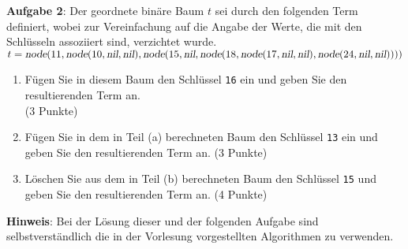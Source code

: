 \documentclass{article}
\begin{document}
\noindent
\textbf{Aufgabe 2}:
Der geordnete bin\"are Baum $t$ sei durch den folgenden Term definiert,
wobei zur Vereinfachung auf die Angabe der Werte, die mit den Schl\"usseln
assoziiert sind, verzichtet wurde.
\\[0.2cm]
\hspace*{1.3cm}
$t = \textsl{node}(11, \textsl{node}(10, \textsl{nil}, \textsl{nil}), \textsl{node}(15, \textsl{nil}, 
  \textsl{node}(18, \textsl{node}(17, \textsl{nil}, \textsl{nil}), 
  \textsl{node}(24, \textsl{nil}, \textsl{nil}))))
$
\begin{enumerate}
\item F\"ugen Sie in diesem Baum den Schl\"ussel \texttt{16} ein und geben Sie den
      resultierenden Term an.  \\ 
      \hspace*{\fill} (3 Punkte)
\item F\"ugen Sie in dem in Teil (a) berechneten Baum den Schl\"ussel \texttt{13} ein und
      geben Sie den resultierenden Term an.     
      \hspace*{\fill} (3 Punkte)
\item L\"oschen Sie aus dem in Teil (b) berechneten Baum den Schl\"ussel \texttt{15} und
      geben Sie den resultierenden Term an. 
      \hspace*{\fill} (4 Punkte)
\end{enumerate}
\textbf{Hinweis}: Bei der L\"osung dieser und der folgenden Aufgabe sind selbstverst\"andlich
die in der Vorlesung vorgestellten Algorithmen zu verwenden.
\vspace{0.3cm}
\end{document}
